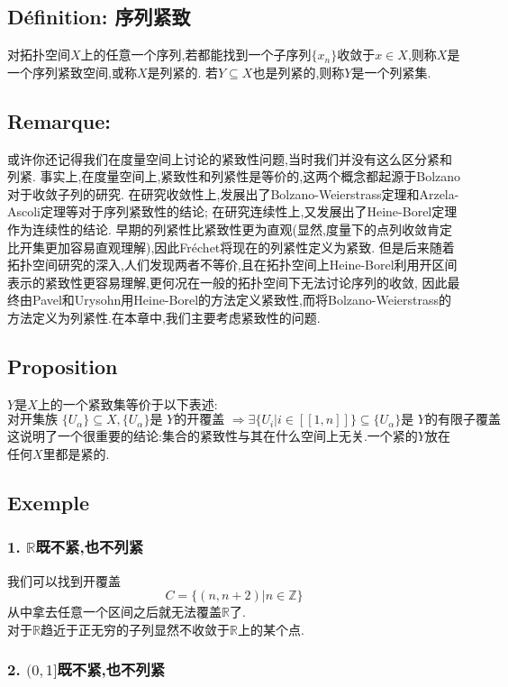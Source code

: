 \documentclass[12pt, a4paper, oneside]{ctexbook}
\begin{document}
  \subsection{Définition: 序列紧致}
  对拓扑空间$X$上的任意一个序列,若都能找到一个子序列$\{ x_n\}$收敛于$x\in X$,则称$X$是一个序列紧致空间,或称$X$是列紧的.
  若$Y\subseteq X$也是列紧的,则称$Y$是一个列紧集.
  \subsection{Remarque: }
  或许你还记得我们在度量空间上讨论的紧致性问题,当时我们并没有这么区分紧和列紧.
  事实上,在度量空间上,紧致性和列紧性是等价的,这两个概念都起源于Bolzano对于收敛子列的研究.
  在研究收敛性上,发展出了Bolzano-Weierstrass定理和Arzela-Ascoli定理等对于序列紧致性的结论;
  在研究连续性上,又发展出了Heine-Borel定理作为连续性的结论.
  早期的列紧性比紧致性更为直观(显然,度量下的点列收敛肯定比开集更加容易直观理解),因此Fréchet将现在的列紧性定义为紧致.
  但是后来随着拓扑空间研究的深入,人们发现两者不等价,且在拓扑空间上Heine-Borel利用开区间表示的紧致性更容易理解,更何况在一般的拓扑空间下无法讨论序列的收敛,
  因此最终由Pavel和Urysohn用Heine-Borel的方法定义紧致性,而将Bolzano-Weierstrass的方法定义为列紧性.在本章中,我们主要考虑紧致性的问题.
  \subsection{Proposition}
  $Y$是$X$上的一个紧致集等价于以下表述:
  $$
  \text{对开集族 }\{U_\alpha\}\subseteq X, \{U_\alpha\}\text{是 }Y\text{的开覆盖 }\Rightarrow
  \exists\{U_i|i\in[\![1,n]\!]\}\subseteq\{U_\alpha\}\text{是 }Y\text{的有限子覆盖 }
  $$
  这说明了一个很重要的结论:集合的紧致性与其在什么空间上无关.一个紧的$Y$放在任何$X$里都是紧的.
  \subsection{Exemple}
  \subsubsection{1.  $\mathbb{R}$既不紧,也不列紧}
  我们可以找到开覆盖
  $$
  C=\{(n,n+2)|n\in\mathbb{Z}\}
  $$
  从中拿去任意一个区间之后就无法覆盖$\mathbb{R}$了.\\
  对于$\mathbb{R}$趋近于正无穷的子列显然不收敛于$\mathbb{R}$上的某个点.
  \subsubsection{2.  $(0,1]$既不紧,也不列紧}
\end{document}
